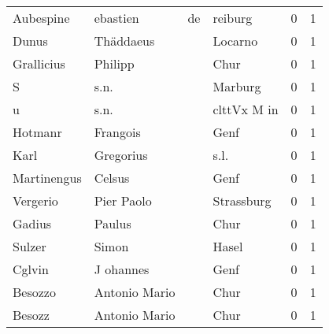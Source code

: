 \begin{center}
\begin{tiny}
\begin{longtabu}{llllrr}
                Aubespine &                           ebastien &          de &                                     reiburg &          0 &         1 \\
                    Dunus &                          Thäddaeus &             &                                     Locarno &          0 &         1 \\
               Grallicius &                            Philipp &             &                                        Chur &          0 &         1 \\
                        S &                               s.n. &             &                                     Marburg &          0 &         1 \\
                        u &                               s.n. &             &                                 clttVx M in &          0 &         1 \\
                  Hotmanr &                           Frangois &             &                                        Genf &          0 &         1 \\
                     Karl &                          Gregorius &             &                                        s.l. &          0 &         1 \\
              Martinengus &                             Celsus &             &                                        Genf &          0 &         1 \\
                 Vergerio &                         Pier Paolo &             &                                  Strassburg &          0 &         1 \\
                   Gadius &                             Paulus &             &                                        Chur &          0 &         1 \\
                   Sulzer &                              Simon &             &                                       Hasel &          0 &         1 \\
                   Cglvin &                          J ohannes &             &                                        Genf &          0 &         1 \\
                  Besozzo &                      Antonio Mario &             &                                        Chur &          0 &         1 \\
                   Besozz &                      Antonio Mario &             &                                        Chur &          0 &         1 \\

\end{longtabu}
\end{tiny}
\end{center}
